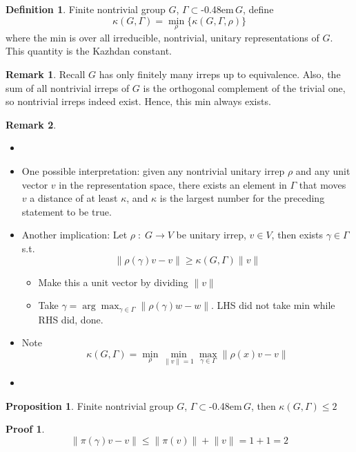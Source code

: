 \documentclass{book}
\newcommand{\syin}{$\subset$\kern-0.48em\raisebox{.20ex}{\tiny S}$\,$}
\newcommand{\norm}[1]{\lVert #1 \rVert}
\theoremstyle{definition}
\newtheorem{proposition}[lemma]{Proposition}
\newtheorem{definition}[lemma]{Definition}
\theoremstyle{remarkstyle}
\newtheorem*{remark}{Remark}%
\newtheorem*{myproof}{Proof}%
\begin{document}
\begin{definition} 
    Finite nontrivial group $G$, $\Gamma$\syin$G$, define 
    $$
    \kappa(G,\Gamma) = \min_{\rho}\{\kappa(G,\Gamma,\rho)\}
    $$
    where the min is over all irreducible, nontrivial, unitary representations of $G$. This quantity is the Kazhdan constant. \newline 
\end{definition}
\begin{remark}
    Recall $G$ has only finitely many irreps up to equivalence. Also, the sum of all nontrivial irreps of $G$ is the orthogonal complement of the trivial one, so nontrivial irreps indeed exist. Hence, this min always exists.
\end{remark}
\begin{remark}
    \begin{itemize}
        \item[]
        \item One possible interpretation: given any nontrivial unitary irrep $\rho$ and any unit vector $v$ in the representation space, there exists an element in $\Gamma$ that moves $v$ a distance of at least $\kappa$, and $\kappa$ is the largest number for the preceding statement to be true. 
        \item Another implication: Let $\rho\;:\;G\rightarrow V$ be unitary irrep, $v\in V$, then exists $\gamma\in\Gamma$ s.t. 
        $$
        \norm{\rho(\gamma)v-v}\ge \kappa(G,\Gamma)\norm{v}
        $$
        \begin{itemize}
            \item Make this a unit vector by dividing $\norm{v}$
            \item Take $\gamma=\arg\max_{\gamma\in\Gamma}\norm{\rho(\gamma)w-w} $. LHS did not take min while RHS did, done.
        \end{itemize}
        \item Note 
        $$
        \kappa(G,\Gamma) = \min_{\rho}\min_{\norm{v}=1}\max_{\gamma\in\Gamma}\norm{\rho(x)v-v}
        $$
        \item[] 
    \end{itemize}
\end{remark}

\begin{proposition}
    Finite nontrivial group $G$, $\Gamma$\syin$G$, then $\kappa(G,\Gamma)\le 2$
\end{proposition}
\begin{myproof}
$$
\norm{\pi(\gamma)v-v} \le \norm{\pi(v)}+\norm{v} = 1+1 = 2
$$\newline 
\end{myproof}
\end{document}

